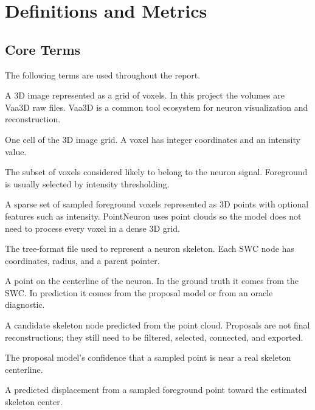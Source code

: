 \documentclass[11pt]{article}
\begin{document}
\section{Definitions and Metrics}

\subsection{Core Terms}

The following terms are used throughout the report.

\begin{description}[leftmargin=3.6cm]
  \item[Volume] A 3D image represented as a grid of voxels. In this project the
  volumes are Vaa3D raw files. Vaa3D is a common tool ecosystem for neuron
  visualization and reconstruction.

  \item[Voxel] One cell of the 3D image grid. A voxel has integer coordinates
  and an intensity value.

  \item[Foreground] The subset of voxels considered likely to belong to the
  neuron signal. Foreground is usually selected by intensity thresholding.

  \item[Point cloud] A sparse set of sampled foreground voxels represented as
  3D points with optional features such as intensity. PointNeuron uses point
  clouds so the model does not need to process every voxel in a dense 3D grid.

  \item[SWC] The tree-format file used to represent a neuron skeleton. Each SWC
  node has coordinates, radius, and a parent pointer.

  \item[Skeleton node] A point on the centerline of the neuron. In the ground
  truth it comes from the SWC. In prediction it comes from the proposal model
  or from an oracle diagnostic.

  \item[Proposal] A candidate skeleton node predicted from the point cloud.
  Proposals are not final reconstructions; they still need to be filtered,
  selected, connected, and exported.

  \item[Objectness] The proposal model's confidence that a sampled point is
  near a real skeleton centerline.

  \item[Center offset] A predicted displacement from a sampled foreground point
  toward the estimated skeleton center.


\end{description}
\end{document}
